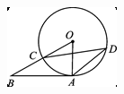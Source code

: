\documentclass[12pt]{article}
\begin{document}
\begin{center}
\begin{minipage}{0.32\textwidth}
\includegraphics[width=0.95\linewidth]{out_rommath_origin/items/geo338-origin/assets/figure_circle.png}
\end{minipage}
\par
\end{center}
\bigskip
\end{document}
